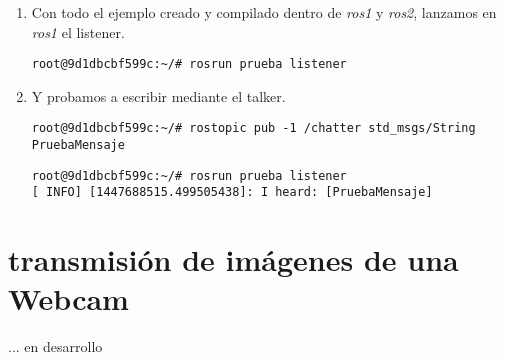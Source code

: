 \begin{enumerate}
\begin{enumerate}
			\item Con todo el ejemplo creado y compilado dentro de \emph{ros1} y \emph{ros2}, lanzamos en \emph{ros1} el listener.
			\begin{lstlisting}[style=consola]
root@9d1dbcbf599c:~/# rosrun prueba listener	
			\end{lstlisting}
			
			\item Y probamos a escribir mediante el talker.
			\begin{lstlisting}[style=consola]
root@9d1dbcbf599c:~/# rostopic pub -1 /chatter std_msgs/String PruebaMensaje
			\end{lstlisting}
			\begin{lstlisting}[style=consola]
root@9d1dbcbf599c:~/# rosrun prueba listener
[ INFO] [1447688515.499505438]: I heard: [PruebaMensaje]
			\end{lstlisting}

		\end{enumerate}
		
	\end{enumerate}
	
	\section{transmisión de imágenes de una Webcam}
	{\color{red}... en desarrollo}